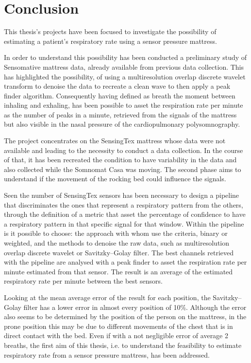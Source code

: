 \chapter{Conclusion}
This thesis's projects have been focused to investigate the possibility of estimating a patient's respiratory rate using a sensor pressure mattress. 

In order to understand this possibility has been conducted a preliminary study of Sensomative mattress data, already available from previous data collection. This has highlighted the possibility, of using a multiresolution overlap discrete wavelet transform to denoise the data to recreate a clean wave to then apply a peak finder algorithm. Consequently having defined as breath the moment between inhaling and exhaling, has been possible to asset the respiration rate per minute as the number of peaks in a minute, retrieved from the signals of the mattress but also visible in the nasal pressure of the cardiopulmonary polysomnography.

The project concentrates on the SensingTex mattress whose data were not available and leading to the necessity to conduct a data collection. In the course of that, it has been recreated the condition to have variability in the data and also collected while the Somnomat Casa was moving. The second phase aims to understand if the movement of the rocking bed could influence the signals.

Seen the number of SensingTex sensors has been necessary to design a pipeline that discriminates the ones that represent a respiratory pattern from the others, through the definition of a metric that asset the percentage of confidence to have a respiratory pattern in that specific signal for that window. Within the pipeline is it possible to choose: the approach with whom use the criteria, binary or weighted, and the methods to denoise the raw data, such as multiresolution overlap discrete wavelet or Savitzky–Golay filter.
The best channels retrieved with the pipeline are analysed with a peak finder to asset the respiration rate per minute estimated from that sensor. The result is an average of the estimated respiratory rate per minute between the best sensors.

Looking at the mean average error of the result for each position, the Savitzky–Golay filter has a lower error in almost every position of 10\%. Although the error also seems to be determined by the position of the person on the mattress, in the prone position this may be due to different movements of the chest that is in direct contact with the bed. Even if with a not negligible error of average 2 breaths, the first aim of this thesis, i.e. to understand the feasibility to estimate respiratory rate from a sensor pressure mattress, has been addressed.

